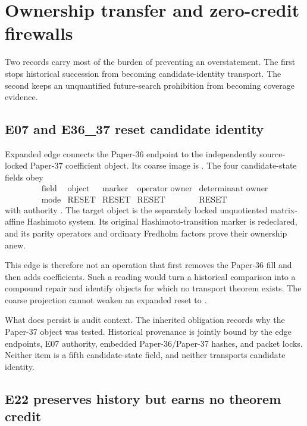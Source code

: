 \section{Ownership transfer and zero-credit firewalls}
\label{sec:ownership}

Two records carry most of the burden of preventing an overstatement.  The
first stops historical succession from becoming candidate-identity transport.
The second keeps an unquantified future-search prohibition from becoming
coverage evidence.

\subsection{E07 and E36\_37 reset candidate identity}

Expanded edge  connects the Paper-36 endpoint to the independently
source-locked Paper-37 coefficient object.  Its coarse image is
.  The four candidate-state fields obey
\begin{equation}
\begin{array}{c|cccc}
\text{field} & \text{object} & \text{marker} & \text{operator owner}
  & \text{determinant owner}\\
\hline
\text{mode} & \mathrm{RESET} & \mathrm{RESET} & \mathrm{RESET}
  & \mathrm{RESET}
\end{array}
\label{eq:four-resets}
\end{equation}
with authority .  The target object is the
separately locked unquotiented matrix-affine Hashimoto system.  Its original
Hashimoto-transition marker is redeclared, and its parity operators and
ordinary Fredholm factors prove their ownership anew.

This edge is therefore not an operation that first removes the Paper-36 fill
and then adds coefficients.  Such a reading would turn a historical comparison
into a compound repair and identify objects for which no transport theorem
exists.  The coarse projection cannot weaken an expanded reset to
.

What does persist is audit context.  The inherited obligation records why the
Paper-37 object was tested.  Historical provenance is jointly bound by the
edge endpoints, E07 authority, embedded Paper-36/Paper-37 hashes, and packet
locks.  Neither item is a fifth candidate-state field, and neither transports
candidate identity.

\subsection{E22 preserves history but earns no theorem credit}

